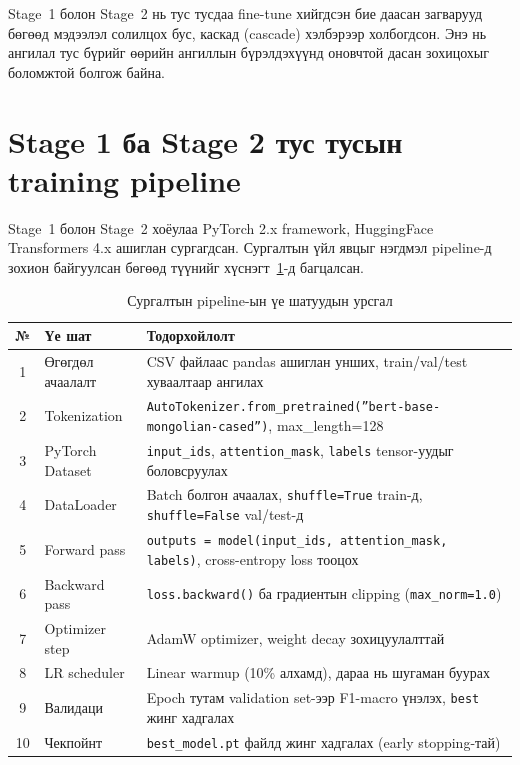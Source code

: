 Stage~1 болон Stage~2 нь тус тусдаа fine-tune хийгдсэн бие даасан загварууд
бөгөөд мэдээлэл солилцох бус, каскад (cascade) хэлбэрээр холбогдсон. Энэ нь
ангилал тус бүрийг өөрийн ангиллын бүрэлдэхүүнд оновчтой дасан зохицохыг
боломжтой болгож байна.

\section{Stage 1 ба Stage 2 тус тусын training pipeline}

Stage~1 болон Stage~2 хоёулаа PyTorch 2.x framework, HuggingFace Transformers
4.x ашиглан сургагдсан. Сургалтын үйл явцыг нэгдмэл pipeline-д зохион байгуулсан
бөгөөд түүнийг хүснэгт~\ref{tab:pipeline-flow}-д багцалсан.

\begin{table}[H]
\centering
\caption{Сургалтын pipeline-ын үе шатуудын урсгал}
\label{tab:pipeline-flow}
\begin{tabular}{@{}clp{8cm}@{}}
\toprule
\textbf{№} & \textbf{Үе шат} & \textbf{Тодорхойлолт} \\
\midrule
1 & Өгөгдөл ачаалалт       & CSV файлаас pandas ашиглан унших, train/val/test хуваалтаар ангилах \\
2 & Tokenization           & \texttt{AutoTokenizer.from\_pretrained(''bert-base-mongolian-cased'')}, max\_length=128 \\
3 & PyTorch Dataset        & \texttt{input\_ids}, \texttt{attention\_mask}, \texttt{labels} tensor-уудыг боловсруулах \\
4 & DataLoader             & Batch болгон ачаалах, \texttt{shuffle=True} train-д, \texttt{shuffle=False} val/test-д \\
5 & Forward pass           & \texttt{outputs = model(input\_ids, attention\_mask, labels)}, cross-entropy loss тооцох \\
6 & Backward pass          & \texttt{loss.backward()} ба градиентын clipping (\texttt{max\_norm=1.0}) \\
7 & Optimizer step         & AdamW optimizer, weight decay зохицуулалттай \\
8 & LR scheduler           & Linear warmup (10\% алхамд), дараа нь шугаман буурах \\
9 & Валидаци               & Epoch тутам validation set-ээр F1-macro үнэлэх, \texttt{best} жинг хадгалах \\
10 & Чекпойнт              & \texttt{best\_model.pt} файлд жинг хадгалах (early stopping-тай) \\
\bottomrule
\end{tabular}
\end{table}

